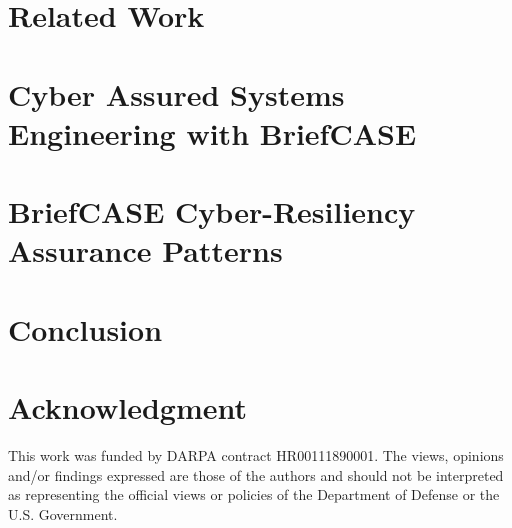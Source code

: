 \documentclass[conference]{IEEEtran}
\begin{document}
\section{Related Work}
\label{sec:related-work}


\section{Cyber Assured Systems Engineering with BriefCASE}
\label{sec:briefcase}


\section{BriefCASE Cyber-Resiliency Assurance Patterns}
\label{sec:assurance-pattern}


\section{Conclusion}
\label{sec:conclusion}


\section{Acknowledgment}
This work was funded by DARPA contract HR00111890001. The views, opinions and/or findings expressed are those of the authors and should not be interpreted as representing the official views or policies of the Department of Defense or the U.S. Government.



\end{document}
